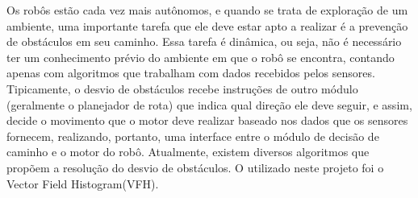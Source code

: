 Os robôs estão cada vez mais autônomos, e quando se trata de
exploração de um ambiente, uma importante tarefa que ele deve estar
apto a realizar é a prevenção de obstáculos em seu caminho. Essa
tarefa é dinâmica, ou seja, não é necessário ter um conhecimento
prévio do ambiente em que o robô se encontra, contando apenas com
algoritmos que trabalham com dados recebidos pelos
sensores. Tipicamente, o desvio de obstáculos recebe instruções de
outro módulo (geralmente o planejador de rota) que indica qual direção
ele deve seguir, e assim, decide o movimento que o motor deve realizar
baseado nos dados que os sensores fornecem, realizando, portanto, uma
interface entre o módulo de decisão de caminho e o motor do robô.
Atualmente, existem diversos algoritmos que propõem a resolução do
desvio de obstáculos. O utilizado neste projeto foi o Vector Field
Histogram(VFH).